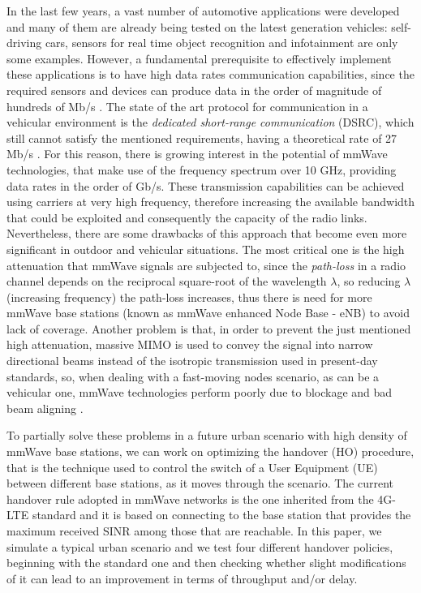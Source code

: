 \documentclass[conference,10pt]{IEEEtran}
\begin{document}
In the last few years, a vast number of automotive applications were developed and many of them are already being tested on the latest generation vehicles: self-driving cars, sensors for real time object recognition and infotainment are only some examples. However, a fundamental prerequisite to effectively implement these applications is to have high data rates communication capabilities, since the required sensors and devices can produce data in the order of magnitude of hundreds of Mb/s \cite{surveh}.
The state of the art protocol for communication in a vehicular environment is the \emph{dedicated short-range communication} (DSRC), which still cannot satisfy the mentioned requirements, having a theoretical rate of 27 Mb/s \cite{surveh}. For this reason, there is growing interest in the potential of mmWave technologies, that make use of the frequency spectrum over 10 GHz, providing data rates in the order of Gb/s. These transmission capabilities can be achieved using carriers at very high frequency, therefore increasing the available bandwidth that could be exploited and consequently the capacity of the radio links. Nevertheless, there are some drawbacks of this approach that become even more significant in outdoor and vehicular situations. The most critical one is the high attenuation that mmWave signals are subjected to, since the \emph{path-loss} in a radio channel depends on the reciprocal square-root of the wavelength $\lambda$, so reducing $\lambda$ (increasing frequency) the path-loss increases, thus there is need for more mmWave base stations (known as mmWave enhanced Node Base - eNB) to avoid lack of coverage. Another problem is that, in order to prevent the just mentioned high attenuation, massive MIMO is used to convey the signal into narrow directional beams instead of the isotropic transmission used in present-day standards, so, when dealing with a fast-moving nodes scenario, as can be a vehicular one, mmWave technologies perform poorly due to blockage and bad beam aligning \cite{mmvehicle}.

To partially solve these problems in a future urban scenario with high density of mmWave base stations, we can work on optimizing the handover (HO) procedure, that is the technique used to control the switch of a User Equipment (UE) between different base stations, as it moves through the scenario. The current handover rule adopted in mmWave networks is the one inherited from the 4G-LTE standard and it is based on connecting to the base station that provides the maximum received SINR among those that are reachable. In this paper, we simulate a typical urban scenario and we test four different handover policies, beginning with the standard one and then checking whether slight modifications of it can lead to an improvement in terms of throughput and/or delay.
\end{document}
